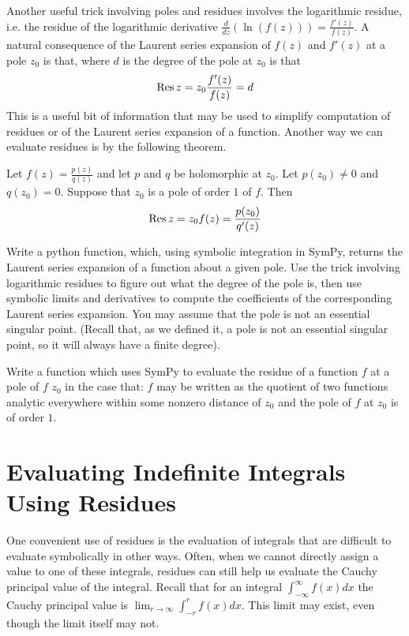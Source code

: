 Another useful trick involving poles and residues involves the logarithmic residue, i.e. the residue of the logarithmic derivative $\frac{d}{dz}(\ln(f(z))) = \frac{f'(z)}{f(z)}$.
A natural consequence of the Laurent series expansion of $f(z)$ and $f'(z)$ at a pole $z_0$ is that, where $d$ is the degree of the pole at $z_0$ is that
\begin{equation*}
\operatorname{Res}{z=z_0} \frac{f'(z)}{f(z)} = d
\end{equation*}
This is a useful bit of information that may be used to simplify computation of residues or of the Laurent series expansion of a function. 
Another way we can evaluate residues is by the following theorem.
\begin{theorem}
Let $f(z)=\frac{p(z)}{q(z)}$ and let $p$ and $q$ be holomorphic at $z_0$. Let $p(z_0) \neq 0$ and $q(z_0)=0$. Suppose that $z_0$ is a pole of order $1$ of $f$. Then 
\begin{equation*}
\operatorname{Res}{z=z_0} f(z) = \frac{p(z_0)}{q'(z)}
\end{equation*}
\end{theorem}

\begin{problem}
Write a python function, which, using symbolic integration in SymPy, returns the Laurent series expansion of a function about a given pole.
Use the trick involving logarithmic residues to figure out what the degree of the pole is, then use symbolic limits and derivatives to compute the coefficients of the corresponding Laurent series expansion.
You may assume that the pole is not an essential singular point.
(Recall that, as we defined it, a pole is not an essential singular point, so it will always have a finite degree).
\end{problem}

\begin{problem}
Write a function which uses SymPy to evaluate the residue of a function $f$ at a pole of $f$ $z_0$ in the case that: $f$ may be written as the quotient of two functions analytic everywhere within some nonzero distance of $z_0$ and the pole of $f$ at $z_0$ is of order $1$.
\end{problem}

\section*{Evaluating Indefinite Integrals Using Residues}

One convenient use of residues is the evaluation of integrals that are difficult to evaluate symbolically in other ways.
Often, when we cannot directly assign a value to one of these integrals, residues can still help us evaluate the Cauchy principal value of the integral.
Recall that for an integral $\int_{-\infty}^{\infty} f(x)dx$ the Cauchy principal value is $\lim_{r\to \infty} \int_{-r}^{r} f(x) dx$. This limit may exist, even though the limit itself may not.

